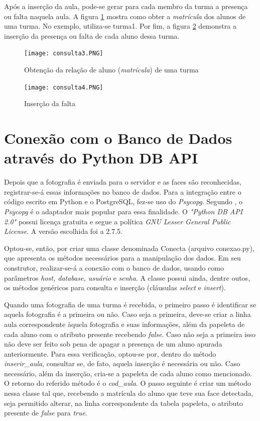 Após a inserção da aula, pode-se gerar para cada membro da turma a presença ou falta naquela aula. A figura \ref{fig:figura64a} mostra como obter a \textit{matrícula} dos alunos de uma turma. No exemplo, utiliza-se turma1. Por fim, a figura \ref{fig:figura65a} demonstra a inserção da presença ou falta de cada aluno dessa turma.  

\begin{figure}[!ht]
	\centering
\texttt{[image: consulta3.PNG]}   
	\caption{Obtenção da relação de aluno (\textit{matrícula}) de uma turma}
	\label{fig:figura64a}
\end{figure}

\begin{figure}[!ht]
	\centering
\texttt{[image: consulta4.PNG]}   
	\caption{Inserção da falta}
	\label{fig:figura65a}
\end{figure}


\section{Conexão com o Banco de Dados através do Python DB API}
Depois que a fotografia é enviada para o servidor e  as faces são reconhecidas, registrar-se-á essas informações no banco de dados. Para a integração entre o código escrito em Python e o PostgreSQL, fez-se uso do \textit{Psycopg}. Segundo \citep{Psycopg}, o \textit{Psycopg} é o adaptador mais popular para essa finalidade. O \textit{"Python DB API 2.0"} possui licença gratuita e segue a política \textit{GNU Lesser General Public License}. A versão escolhida foi a 2.7.5. 

Optou-se, então, por criar uma classe denominada Conecta (arquivo conexao.py), que apresenta os métodos necessários para a manipulação dos dados. Em seu construtor, realizar-se-á a conexão com o banco de dados, usando como parâmetros \textit{host, database, usuário} e \textit{senha}. A classe possui ainda, dentre outos, os métodos genéricos para consulta e inserção (cláusulas \textit{select} e \textit{insert}). 

Quando uma fotografia de uma turma é recebida, o primeiro passo é identificar se aquela fotografia é a primeira ou não. Caso seja a primeira, deve-se criar a linha aula correspondente àquela fotografia e suas informações, além da papeleta de cada aluno com o atributo presente recebendo \textit{false}. Caso não seja a primeira isso não deve ser feito sob pena de apagar a presença de um aluno apurada anteriormente. Para essa verificação, optou-se por, dentro do método \textit{inserir\_aula}, consultar se, de fato, aquela inserção é necessária ou não. Caso necessário, além da inserção, cria-se a papeleta de cada aluno como mencionado. O retorno do referido método é o \textit{cod\_aula}.  O passo seguinte é criar um método nessa classe tal que, recebendo a matrícula do aluno que teve sua face detectada, seja permitido alterar, na linha correspondente da tabela papeleta, o atributo presente de \textit{false} para \textit{true}. 

